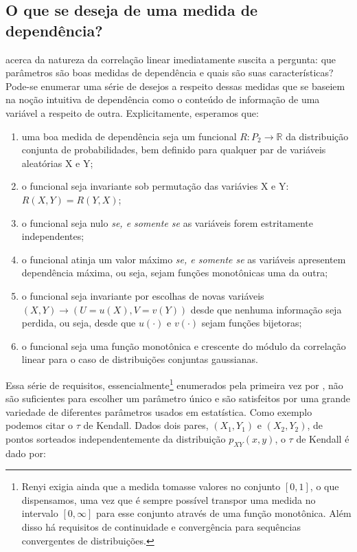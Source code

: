 \subsection{O que se deseja de uma medida de dependência?}

 acerca da natureza da correlação linear imediatamente suscita a pergunta: que parâmetros são boas medidas de dependência e quais são suas características? Pode-se enumerar uma série de desejos a respeito dessas medidas que se baseiem na noção intuitiva de dependência como o conteúdo de informação de uma variável a respeito de outra. Explicitamente, esperamos que:
\begin{enumerate}
\item \label{item:funcional} uma boa medida de dependência seja um funcional $R : P_{2} \to \mathbb{R}$ da distribuição conjunta de probabilidades, bem definido para qualquer par de variáveis aleatórias X e Y; 
\item \label{item:simétrico} o funcional seja invariante sob permutação das variávies X e Y: $R(X,Y) = R(Y,X)$;
\item \label{item:indep} o funcional seja nulo \textit{se, e somente se} as variáveis forem estritamente independentes;
\item \label{item:maximo} o funcional atinja um valor máximo \textit{se, e somente se} as variáveis apresentem dependência máxima, ou seja, sejam funções monotônicas uma da outra;
\item \label{item:invariante} o funcional seja invariante por escolhas de novas variáveis $(X, Y) \rightarrow (U = u(X), V = v(Y))$ desde que nenhuma informação seja perdida, ou seja, desde que  $u(\cdot)$ e $v(\cdot)$ sejam funções bijetoras;
\item \label{item:normal} o funcional seja uma função monotônica e crescente do módulo da correlação linear para o caso de distribuições conjuntas gaussianas.	
\end{enumerate}
Essa série de requisitos, essencialmente\footnote{Renyi exigia ainda que a medida tomasse valores no conjunto $[0,1]$, o que dispensamos, uma vez que é sempre possível transpor uma medida no intervalo $[0,\infty]$ para esse conjunto através de uma função monotônica. Além disso há requisitos de continuidade e convergência para sequências convergentes de distribuições.} enumerados pela primeira vez \cite{Renyi1959, schweizer1981} por \citet{Renyi1959} , não são suficientes para escolher um parâmetro único e são satisfeitos por uma grande variedade de diferentes parâmetros usados em estatística. Como exemplo podemos citar o $\tau$ de Kendall. Dados dois pares, $(X_1, Y_1)$ e $(X_2,Y_2)$, de pontos sorteados independentemente da distribuição $p_{XY}(x,y)$, o $\tau$ de Kendall é dado por:
